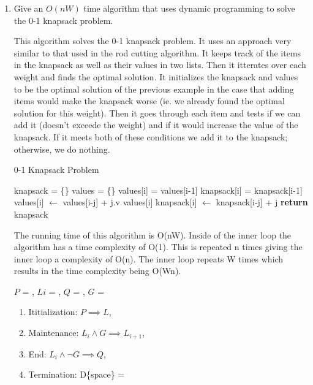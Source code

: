 \documentclass{article}
\begin{document}
\begin{enumerate}
    \item Give an $O(nW)$ time algorithm that uses dynamic programming to solve
        the 0-1 knapsack problem.
        
This algorithm solves the 0-1 knapsack problem. It uses an approach very similar to that used in the rod cutting algorithm. It keeps track of the items in the knapsack as well as their values in two lists. Then it itterates over each weight and finds the optimal solution. It initializes the knapsack and values to be the optimal solution of the previous example in the case that adding items would make the knapsack worse (ie. we already found the optimal solution for this weight). Then it goes through each item and tests if we can add it (doesn't exceede the weight) and if it would increase the value of the knapsack. If it meets both of these conditions we add it to the knapsack; otherwise, we do nothing.

        
\begin{algorithm}
    \caption{0-1 Knapsack Problem}\label{knap}
    \begin{algorithmic}[1]
      \State knapsack = \{\}
      \State values = \{\}
      	values[i] = values[i-1]
      	knapsack[i] = knapsack[i-1]
      			\State values[i] $\gets$ values[i-j] + j.v values[i]
      			\State knapsack[i] $\gets$ knapsack[i-j] + j
      		\EndIf
      	\EndFor
      \EndFor
      \State \textbf{return} knapsack
    \EndFunction
    \end{algorithmic}
\end{algorithm} 

The running time of this algorithm is O(nW). Inside of the inner loop the algorithm has a time complexity of O(1). This is repeated n times giving the inner loop a complexity of O(n). The inner loop repeats W times which results in the time complexity being O(Wn).

$P$ = , $Li$ = , $Q$ = , $G$ = 
    \begin{enumerate}
        \item Ititialization: $P \implies L$, 
        \item Maintenance: $L_{i} \land G \implies L_{i+1}$, 
        \item End: $L_{i} \land \neg G \implies Q$, 
        \item Termination: D\{space\} =  
    \end{enumerate}
        
\end{enumerate}
\end{document}
